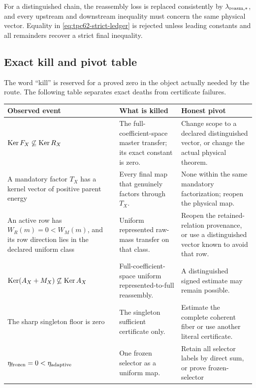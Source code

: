 For a distinguished chain, the reassembly loss is replaced consistently by
\(\lambda_{\rm reasm,*}\), and every upstream and downstream inequality
must concern the same physical vector.  Equality in
\eqref{eq:tpc62-strict-ledger} is rejected unless leading constants and all
remainders recover a strict final inequality.

\subsection{Exact kill and pivot table}

The word ``kill'' is reserved for a proved zero in the object actually
needed by the route.  The following table separates exact deaths from
certificate failures.

\begin{center}
\small
\begin{tabular}{>{\raggedright\arraybackslash}p{}
                >{\raggedright\arraybackslash}p{}
                >{\raggedright\arraybackslash}p{}}
\toprule
Observed event & What is killed & Honest pivot\\
\midrule
\(\operatorname{Ker} F_X\not\subseteq\operatorname{Ker} R_X\)
& The full-coefficient-space master transfer; its exact constant is zero.
& Change scope to a declared distinguished vector, or change the actual
  physical theorem.\\
\addlinespace
A mandatory factor \(T_X\) has a kernel vector of positive parent energy
& Every final map that genuinely factors through \(T_X\).
& None within the same mandatory factorization; reopen the physical map.\\
\addlinespace
An active row has \(W_R(m)=0<W_M(m)\), and its row direction lies in the
declared uniform class
& Uniform represented raw-mass transfer on that class.
& Reopen the retained-relation provenance, or use a distinguished vector
  known to avoid that row.\\
\addlinespace
\(\operatorname{Ker}(A_X+M_X)\not\subseteq\operatorname{Ker} A_X\)
& Full-coefficient-space uniform represented-to-full reassembly.
& A distinguished signed estimate may remain possible.\\
\addlinespace
The sharp singleton floor is zero
& The singleton sufficient certificate only.
& Estimate the complete coherent fiber or use another literal certificate.\\
\addlinespace
\(\eta_{\rm frozen}=0<\eta_{\rm adaptive}\)
& One frozen selector as a uniform map.
& Retain all selector labels by direct sum, or prove frozen-selector

\end{tabular}
\end{center}
